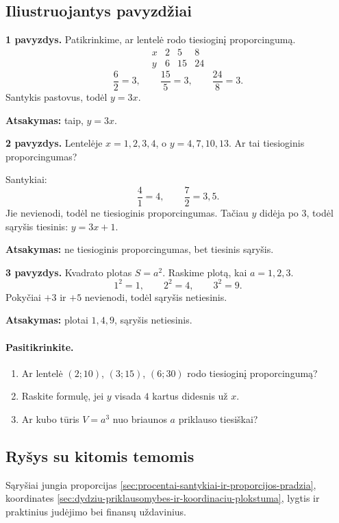 \subsection{Iliustruojantys pavyzdžiai}
\textbf{1 pavyzdys.} Patikrinkime, ar lentelė rodo tiesioginį proporcingumą.
\[
\begin{array}{c|ccc}
x&2&5&8\\ \hline
y&6&15&24
\end{array}
\]
\[
\frac{6}{2}=3,\qquad \frac{15}{5}=3,\qquad \frac{24}{8}=3.
\]
Santykis pastovus, todėl \(y=3x\).

\textbf{Atsakymas:} taip, \(y=3x\).

\textbf{2 pavyzdys.} Lentelėje \(x=1,2,3,4\), o \(y=4,7,10,13\). Ar tai tiesioginis proporcingumas?

Santykiai:
\[
\frac{4}{1}=4,\qquad \frac{7}{2}=3,5.
\]
Jie nevienodi, todėl ne tiesioginis proporcingumas. Tačiau \(y\) didėja po \(3\), todėl sąryšis tiesinis: \(y=3x+1\).

\textbf{Atsakymas:} ne tiesioginis proporcingumas, bet tiesinis sąryšis.

\textbf{3 pavyzdys.} Kvadrato plotas \(S=a^2\). Raskime plotą, kai \(a=1,2,3\).
\[
1^2=1,\qquad 2^2=4,\qquad 3^2=9.
\]
Pokyčiai \(+3\) ir \(+5\) nevienodi, todėl sąryšis netiesinis.

\textbf{Atsakymas:} plotai \(1,4,9\), sąryšis netiesinis.

\paragraph{Pasitikrinkite.}
\begin{enumerate}[label=\arabic*.]
\item Ar lentelė \((2;10)\), \((3;15)\), \((6;30)\) rodo tiesioginį proporcingumą?
\item Raskite formulę, jei \(y\) visada \(4\) kartus didesnis už \(x\).
\item Ar kubo tūris \(V=a^3\) nuo briaunos \(a\) priklauso tiesiškai?
\end{enumerate}

\subsection{Ryšys su kitomis temomis}
Sąryšiai jungia proporcijas \ref{sec:procentai-santykiai-ir-proporcijos-pradzia}, koordinates \ref{sec:dydziu-priklausomybes-ir-koordinaciu-plokstuma}, lygtis ir praktinius judėjimo bei finansų uždavinius.

